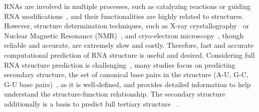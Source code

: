 RNAs
are involved in multiple processes, 
such as catalyzing reactions or guiding RNA modifications~\cite{Eddy:2001,Doudna+Cech:2002,Bachellerie+:2002}, 
and their functionalities are highly related to structures.
However, 
structure determination techniques, such as X-ray crystallography~\cite{Kim+:1971} 
or Nuclear Magnetic Resonance (NMR)~\cite{Scott+Hennig:2008}, 
and 
cryo-electron microscopy~\cite{Lyumkis:2019}, 
though reliable and accurate,
are extremely slow and costly.
Therefore,
fast and accurate computational prediction of RNA structure is useful and desired. %
Considering full RNA %
structure prediction is challenging~\cite{Miao+:2017},
many studies focus on predicting secondary structure,
the set of canonical base pairs in the structure 
(A-U, G-C, G-U base pairs)~\cite{Tinoco+Bustamante:1999},
as it is well-defined, 
and provides detailed information to help understand 
the structure-function relationship.
The secondary structure additionally is a basis to predict full tertiary structure
~\cite{Flores+Altman:2010,Seetin+Mathews:2011}.


